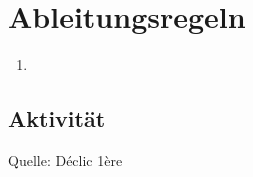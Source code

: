 		
		
		\section{Ableitungsregeln}

\begin{enumerate}
\item 
\end{enumerate}
	\subsection{Aktivität}

Quelle: Déclic 1ère

